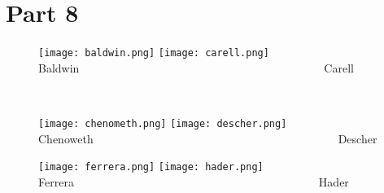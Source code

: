 \documentclass{article}
\begin{document}
\clearpage
\section{Part 8}
\begin{figure}[ht!]
  \texttt{[image: baldwin.png]} \hfill
  \texttt{[image: carell.png]}
  \newline Baldwin\ \ \ \ \ \ \ \ \ \ \ \ \ \ \ \ \ \ \ \ \ \ \ \ \ \ \ \ \ \ \ \ \ \ \ \ \ \ \ \ \ \ \ Carell
\end{figure}\

\begin{figure}[ht!]
  \texttt{[image: chenometh.png]} \hfill
  \texttt{[image: descher.png]}
  \newline Chenoweth\ \ \ \ \ \ \ \ \ \ \ \ \ \ \ \ \ \ \ \ \ \ \ \ \ \ \ \ \ \ \ \ \ \ \ \ \ \ \ \ \ \ \ Descher
\end{figure}

\begin{figure}[ht!]
  \texttt{[image: ferrera.png]} \hfill
  \texttt{[image: hader.png]}
  \newline Ferrera\ \ \ \ \ \ \ \ \ \ \ \ \ \ \ \ \ \ \ \ \ \ \ \ \ \ \ \ \ \ \ \ \ \ \ \ \ \ \ \ \ \ \ Hader
\end{figure}
\end{document}
